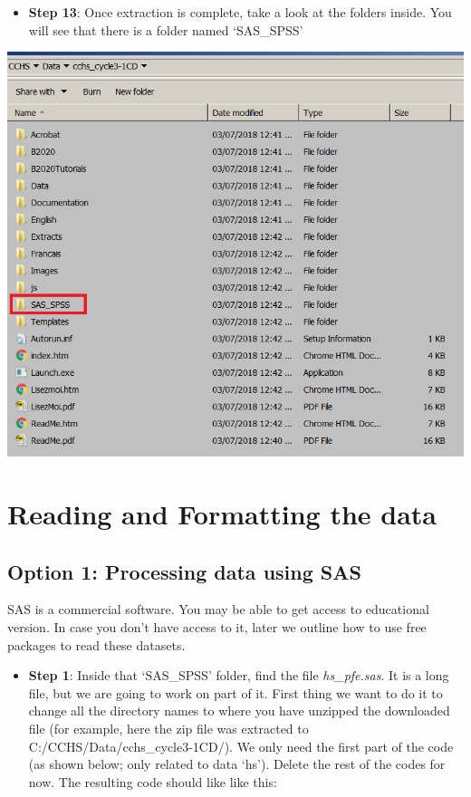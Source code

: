 \documentclass[
]{book}
\providecommand{\tightlist}{%
  \setlength{\itemsep}{0pt}\setlength{\parskip}{0pt}}
\begin{document}
\begin{itemize}
\tightlist
\item
  \textbf{Step 13}: Once extraction is complete, take a look at the folders inside. You will see that there is a folder named `SAS\_SPSS'
\end{itemize}

\includegraphics[width=0.65\linewidth]{images/abacus13}

\hypertarget{reading-and-formatting-the-data}{%
\section{Reading and Formatting the data}\label{reading-and-formatting-the-data}}

\hypertarget{option-1-processing-data-using-sas}{%
\subsection{Option 1: Processing data using SAS}\label{option-1-processing-data-using-sas}}

SAS is a commercial software. You may be able to get access to educational version. In case you don't have access to it, later we outline how to use free packages to read these datasets.

\begin{itemize}
\tightlist
\item
  \textbf{Step 1}: Inside that `SAS\_SPSS' folder, find the file \emph{hs\_pfe.sas}. It is a long file, but we are going to work on part of it. First thing we want to do it to change all the directory names to where you have unzipped the downloaded file (for example, here the zip file was extracted to C:/CCHS/Data/cchs\_cycle3-1CD/). We only need the first part of the code (as shown below; only related to data `hs'). Delete the rest of the codes for now. The resulting code should like like this:
\end{itemize}
\end{document}
